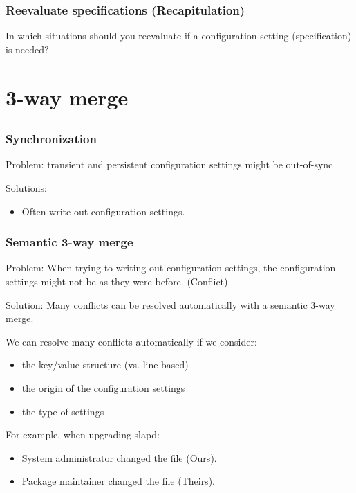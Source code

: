 \begin{frame}
	\frametitle{Reevaluate specifications (Recapitulation)}

	In which situations should you reevaluate if a configuration setting (specification) is needed?

	\pause

\end{frame}


\section{3-way merge}

\subsection{}

\begin{frame}
	\frametitle{Synchronization}

	Problem: transient and persistent configuration settings might be out-of-sync~\cite{jin2014configurations}

	\pause


	\pause

	Solutions:
	\begin{itemize}
	\item Often write out configuration settings.
	\end{itemize}
\end{frame}

\begin{frame}
	\frametitle{Semantic 3-way merge}

	Problem: When trying to writing out configuration settings, the configuration settings might not be as they were before. (Conflict)

	\pause

	Solution: Many conflicts can be resolved automatically with a semantic 3-way merge.

	\pause

	We can resolve many conflicts automatically if we consider:
	\begin{itemize}[<+-| alert@+>]
	\item the key/value structure (vs. line-based)
	\item the origin of the configuration settings
	\item the type of settings
	\end{itemize}

	\pause[\thebeamerpauses]

	For example, when upgrading slapd:
	\begin{itemize}
	\item System administrator changed the file (Ours).
	\item Package maintainer changed the file (Theirs).
	\end{itemize}
\end{frame}

